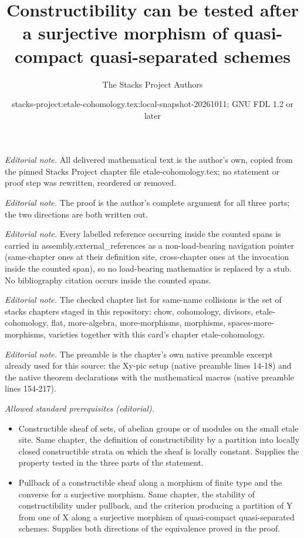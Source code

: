 \documentclass[10pt,a4paper]{amsart}
\title{Constructibility can be tested after a surjective morphism of quasi-compact quasi-separated schemes}
\author{The Stacks Project Authors}
\date{stacks-project:etale-cohomology.tex:local-snapshot-20261011; GNU FDL 1.2 or later}
\theoremstyle{plain}
\theoremstyle{definition}
\theoremstyle{remark}
\numberwithin{equation}{subsection}
\begin{document}
\maketitle
\noindent\textit{Editorial note.} All delivered mathematical text is the author's own, copied from the pinned Stacks Project chapter file etale-cohomology.tex; no statement or proof step was rewritten, reordered or removed.\par\medskip
\noindent\textit{Editorial note.} The proof is the author's complete argument for all three parts; the two directions are both written out.\par\medskip
\noindent\textit{Editorial note.} Every labelled reference occurring inside the counted spans is carried in assembly.external\_references as a non-load-bearing navigation pointer (same-chapter ones at their definition site, cross-chapter ones at the invocation inside the counted span), so no load-bearing mathematics is replaced by a stub. No bibliography citation occurs inside the counted spans.\par\medskip
\noindent\textit{Editorial note.} The checked chapter list for same-name collisions is the set of stacks chapters staged in this repository: chow, cohomology, divisors, etale-cohomology, flat, more-algebra, more-morphisms, morphisms, spaces-more-morphisms, varieties together with this card's chapter etale-cohomology.\par\medskip
\noindent\textit{Editorial note.} The preamble is the chapter's own native preamble excerpt already used for this source: the Xy-pic setup (native preamble lines 14-18) and the native theorem declarations with the mathematical macros (native preamble lines 154-217).\par\medskip
\noindent\textit{Allowed standard prerequisites (editorial).}\begin{itemize}
\item Constructible sheaf of sets, of abelian groups or of modules on the small etale site. Same chapter, the definition of constructibility by a partition into locally closed constructible strata on which the sheaf is locally constant. Supplies the property tested in the three parts of the statement.
\item Pullback of a constructible sheaf along a morphism of finite type and the converse for a surjective morphism. Same chapter, the stability of constructibility under pullback, and the criterion producing a partition of Y from one of X along a surjective morphism of quasi-compact quasi-separated schemes. Supplies both directions of the equivalence proved in the proof.
\end{itemize}\medskip
\end{document}
